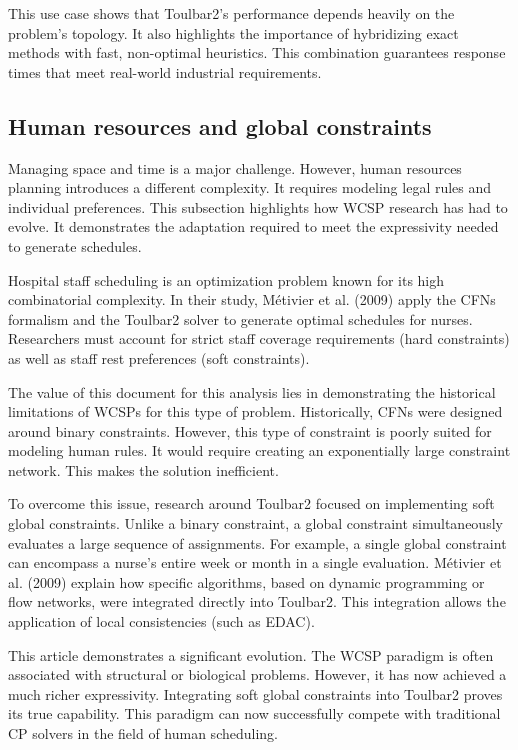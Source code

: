 \documentclass[runningheads]{llncs}
\begin{document}
This use case shows that Toulbar2's performance depends heavily on the problem's topology. It also highlights the importance of hybridizing exact methods with fast, non-optimal heuristics. 
This combination guarantees response times that meet real-world industrial requirements.

\subsection{Human resources and global constraints}

Managing space and time is a major challenge. However, human resources planning introduces a different complexity. It requires modeling legal rules and individual preferences.
This subsection highlights how \ac{WCSP} research has had to evolve. It demonstrates the adaptation required to meet the expressivity needed to generate schedules.

Hospital staff scheduling is an optimization problem known for its high combinatorial complexity. In their study, Métivier et al. (2009)\cite{nurse_rostering_problems} apply the \ac{CFNs} formalism and the Toulbar2 solver to generate optimal schedules for nurses. 
Researchers must account for strict staff coverage requirements (hard constraints) as well as staff rest preferences (soft constraints).

The value of this document for this analysis lies in demonstrating the historical limitations of \acp{WCSP} for this type of problem. Historically, \ac{CFNs} were designed around binary constraints. 
However, this type of constraint is poorly suited for modeling human rules. It would require creating an exponentially large constraint network. This makes the solution inefficient.

To overcome this issue, research around Toulbar2 focused on implementing soft global constraints. Unlike a binary constraint, a global constraint simultaneously evaluates a large sequence of assignments. 
For example, a single global constraint can encompass a nurse's entire week or month in a single evaluation.
Métivier et al. (2009) explain how specific algorithms, based on dynamic programming or flow networks, were integrated directly into Toulbar2. This integration allows the application of local consistencies (such as \ac{EDAC}).

This article demonstrates a significant evolution. The \ac{WCSP} paradigm is often associated with structural or biological problems. However, it has now achieved a much richer expressivity.
Integrating soft global constraints into Toulbar2 proves its true capability. This paradigm can now successfully compete with traditional \ac{CP} solvers in the field of human scheduling.
\end{document}
